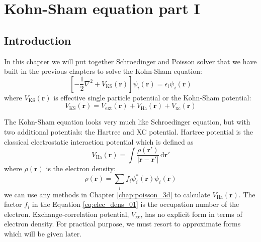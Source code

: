 \chapter{Kohn-Sham equation part I}

\section{Introduction}

In this chapter we will put together Schroedinger and Poisson solver
that we have built in the previous chapters to solve the Kohn-Sham equation:
\begin{equation}
\left[ -\frac{1}{2}\nabla^2 + V_{\mathrm{KS}}(\mathbf{r}) \right]
\psi_{i}(\mathbf{r}) = \epsilon_{i} \psi_{i}(\mathbf{r})
\end{equation}
where $V_{\mathrm{KS}}(\mathbf{r})$ is effective single particle potential or
the Kohn-Sham potential:
\begin{equation}
V_{\mathrm{KS}}(\mathbf{r}) =
V_{\mathrm{ext}}(\mathbf{r}) + V_{\mathrm{Ha}}(\mathbf{r}) + V_{\mathrm{xc}}(\mathbf{r})
\label{eq:KS_pot_local}
\end{equation}

The Kohn-Sham equation looks very much like Schroedinger equation,
but with two additional potentials: the Hartree and XC potential.
Hartree potential is the classical electrostatic interaction potential which is defined as
\begin{equation}
V_{\mathrm{Ha}}(\mathbf{r}) = \int \frac{\rho(\mathbf{r}')}{\left| \mathbf{r} - \mathbf{r}' \right|}
\,\mathrm{d}\mathbf{r}'
\end{equation}
where $\rho(\mathbf{r})$ is the electron density:
\begin{equation}
\rho(\mathbf{r}) = \sum_{i} f_{i} \psi_{i}^{*}(\mathbf{r}) \psi_{i}(\mathbf{r})
\label{eq:elec_dens_01}
\end{equation}
we can use any methods in Chapter \ref{chap:poisson_3d} to calculate
$V_{\mathrm{Ha}}(\mathbf{r})$. The factor $f_{i}$ in the Equation \ref{eq:elec_dens_01}
is the occupation number of the electron.
Exchange-correlation potential, $V_{\mathrm{xc}}$, has no explicit form in terms of
electron density. For practical purpose, we must resort to approximate forms which
will be given later.

